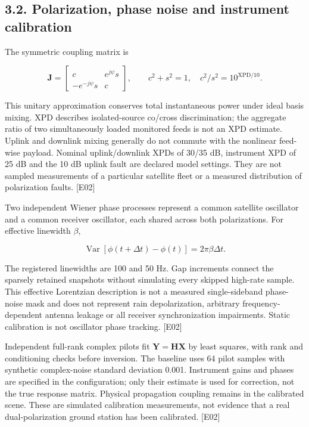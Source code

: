 \documentclass[
  10pt,
]{article}
\begin{document}
\subsection{3.2. Polarization, phase noise and instrument
calibration}\label{polarization-phase-noise-and-instrument-calibration}

The symmetric coupling matrix is

\[\mathbf J=\begin{bmatrix}c&e^{j\psi}s\\-e^{-j\psi}s&c\end{bmatrix},\qquad c^2+s^2=1,\quad c^2/s^2=10^{\mathrm{XPD}/10}.\]

This unitary approximation conserves total instantaneous power under
ideal basis mixing. XPD describes isolated-source co/cross
discrimination; the aggregate ratio of two simultaneously loaded
monitored feeds is not an XPD estimate. Uplink and downlink mixing
generally do not commute with the nonlinear feed-wise payload. Nominal
uplink/downlink XPDs of 30/35 dB, instrument XPD of 25 dB and the 10 dB
uplink fault are declared model settings. They are not sampled
measurements of a particular satellite fleet or a measured distribution
of polarization faults. {[}E02{]}

Two independent Wiener phase processes represent a common satellite
oscillator and a common receiver oscillator, each shared across both
polarizations. For effective linewidth \(\beta\),

\[\operatorname{Var}[\phi(t+\Delta t)-\phi(t)]=2\pi\beta\Delta t.\]

The registered linewidths are 100 and 50 Hz. Gap increments connect the
sparsely retained snapshots without simulating every skipped high-rate
sample. This effective Lorentzian description is not a measured
single-sideband phase-noise mask and does not represent rain
depolarization, arbitrary frequency-dependent antenna leakage or all
receiver synchronization impairments. Static calibration is not
oscillator phase tracking. {[}E02{]}

Independent full-rank complex pilots fit
\(\mathbf Y=\mathbf H\mathbf X\) by least squares, with rank and
conditioning checks before inversion. The baseline uses 64 pilot samples
with synthetic complex-noise standard deviation 0.001. Instrument gains
and phases are specified in the configuration; only their estimate is
used for correction, not the true response matrix. Physical propagation
coupling remains in the calibrated scene. These are simulated
calibration measurements, not evidence that a real dual-polarization
ground station has been calibrated. {[}E02{]}
\end{document}
